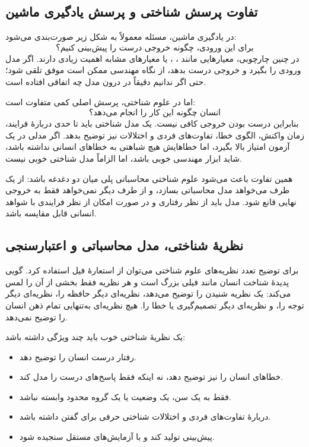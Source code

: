 \subsection{تفاوت پرسش شناختی و پرسش یادگیری ماشین}
در یادگیری ماشین، مسئله معمولاً به شکل زیر صورت‌بندی می‌شود:
\[
\text{برای این ورودی، چگونه خروجی درست را پیش‌بینی کنیم؟}
\]
در چنین چارچوبی، معیارهایی مانند ، ،  یا معیارهای مشابه اهمیت زیادی دارند. اگر مدل ورودی را بگیرد و خروجی درست بدهد، از نگاه مهندسی ممکن است موفق تلقی شود؛ حتی اگر ندانیم دقیقاً در درون مدل چه اتفاقی افتاده است.

اما در علوم شناختی، پرسش اصلی کمی متفاوت است:
\[
\text{انسان چگونه این کار را انجام می‌دهد؟}
\]
بنابراین درست بودن خروجی کافی نیست. یک مدل شناختی باید تا حدی دربارهٔ فرایند، زمان واکنش، الگوی خطا، تفاوت‌های فردی و اختلالات نیز توضیح بدهد. اگر مدلی در یک آزمون امتیاز بالا بگیرد، اما خطاهایش هیچ شباهتی به خطاهای انسانی نداشته باشد، شاید ابزار مهندسی خوبی باشد، اما الزاماً مدل شناختی خوبی نیست.

همین تفاوت باعث می‌شود علوم شناختی محاسباتی پلی میان دو دغدغه باشد: از یک طرف می‌خواهد مدل محاسباتی بسازد، و از طرف دیگر نمی‌خواهد فقط به خروجی نهایی قانع شود. مدل باید از نظر رفتاری و در صورت امکان از نظر فرایندی با شواهد انسانی قابل مقایسه باشد.

\subsection{نظریهٔ شناختی، مدل محاسباتی و اعتبارسنجی}
برای توضیح تعدد نظریه‌های علوم شناختی می‌توان از استعارهٔ فیل استفاده کرد. گویی پدیدهٔ شناخت انسان مانند فیلی بزرگ است و هر نظریه فقط بخشی از آن را لمس می‌کند: یک نظریه شنیدن را توضیح می‌دهد، نظریه‌ای دیگر حافظه را، نظریه‌ای دیگر توجه را، و نظریه‌ای دیگر تصمیم‌گیری یا خطا را. هیچ نظریه‌ای به‌تنهایی تمام ذهن انسان را توضیح نمی‌دهد.

یک نظریهٔ شناختی خوب باید چند ویژگی داشته باشد:
\begin{itemize}
  \item رفتار درست انسان را توضیح دهد.
  \item خطاهای انسان را نیز توضیح دهد، نه اینکه فقط پاسخ‌های درست را مدل کند.
  \item فقط به یک سن، یک وضعیت یا یک گروه محدود وابسته نباشد.
  \item دربارهٔ تفاوت‌های فردی و اختلالات شناختی حرفی برای گفتن داشته باشد.
  \item پیش‌بینی تولید کند و با آزمایش‌های مستقل سنجیده شود.
\end{itemize}

